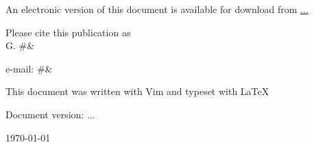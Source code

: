 An electronic version of this document is available for download from \url{...}

Please cite this publication as\\
G. #&%

e-mail: #&%

This document was written with Vim and typeset with \LaTeX

Document version: ...

\today
